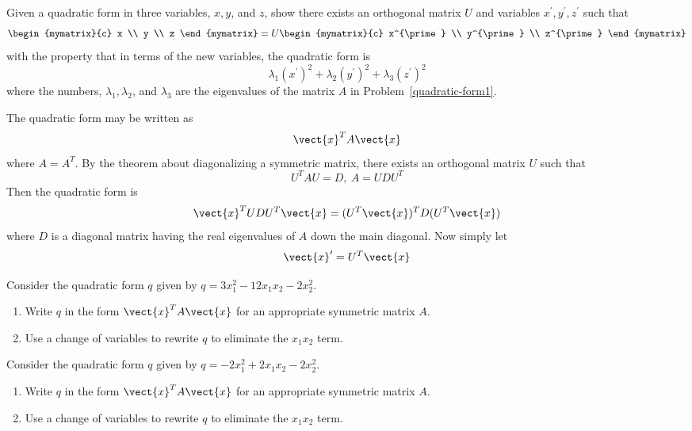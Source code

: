 \begin{ex} Given a quadratic form in three variables, $x,y$, and $z$, show there
exists an orthogonal matrix $U$ and variables $x^{\prime },y^{\prime
},z^{\prime }$ such that 
\begin{equation*}
\begin{mymatrix}{c}
x \\ 
y \\ 
z
\end{mymatrix} =U\begin{mymatrix}{c}
x^{\prime } \\ 
y^{\prime } \\ 
z^{\prime }
\end{mymatrix}
\end{equation*}
with the property that in terms of the new variables, the quadratic form is 
\begin{equation*}
\lambda _{1}(x^{\prime }) ^{2}+\lambda _{2}(y^{\prime
}) ^{2}+\lambda _{3}(z^{\prime }) ^{2}
\end{equation*}
where the numbers, $\lambda _{1},\lambda _{2}$, and $\lambda _{3}$ are the
eigenvalues of the matrix $A$ in Problem~\ref{quadratic-form1}. 
\begin{sol}
The quadratic form
may be written as
\[
\vect{x}^{T}A\vect{x}
\]
where $A=A^{T}$. By the theorem about diagonalizing a symmetric matrix,
there exists an orthogonal matrix $U$ such that
\[
U^{T}AU=D,\ A=UDU^{T}
\]
Then the quadratic form is
\[
\vect{x}^{T}UDU^{T}\vect{x}=(U^{T}\vect{x}) ^{T}D(
U^{T}\vect{x})
\]
where $D$ is a diagonal matrix having the real eigenvalues of $A$ down the
main diagonal. Now simply let
\[
\vect{x}^{\prime } =  U^{T}\vect{x}
\]
\end{sol}
\end{ex}

\begin{ex} Consider the quadratic form $q$ given by $q = 3x_1^2 -12x_1x_2 - 2x_2^2$.\begin{enumerate}
\item Write $q$ in the form $\vect{x}^TA\vect{x}$ for an appropriate symmetric matrix $A$.
\item Use a change of variables to rewrite $q$ to eliminate the $x_1x_2$ term. 
\end{enumerate}
\end{ex}

\begin{ex} Consider the quadratic form $q$ given by $q = -2x_1^2 + 2x_1x_2 - 2x_2^2$.
\begin{enumerate}
\item Write $q$ in the form $\vect{x}^TA\vect{x}$ for an appropriate symmetric matrix $A$.
\item Use a change of variables to rewrite $q$ to eliminate the $x_1x_2$ term. 
\end{enumerate}
\end{ex}

